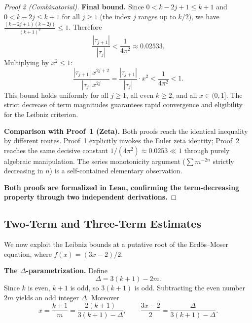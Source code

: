 \documentclass[12pt,a4paper]{article}
\theoremstyle{plain}
\theoremstyle{definition}
\begin{document}
\begin{proof}[Proof 2 (Combinatorial)]
  \medskip
  \noindent\textbf{Final bound.}
  Since $0 < k-2j+1 \le k+1$ and $0 < k-2j \le k+1$ for all $j \ge 1$
  (the index $j$ ranges up to $k/2$), we have
  $\frac{(k-2j+1)(k-2j)}{(k+1)^2} \le 1$.  Therefore
  \[
    \frac{|\tau_{j+1}|}{|\tau_j|}
    < \frac{1}{4\pi^2}
    \approx 0.02533.
  \]
  Multiplying by $x^2 \le 1$:
  \[
    \frac{|\tau_{j+1}|\,x^{2j+2}}{|\tau_j|\,x^{2j}}
    = \frac{|\tau_{j+1}|}{|\tau_j|} \cdot x^2
    < \frac{1}{4\pi^2}
    < 1.
  \]
  This bound holds uniformly for all $j \ge 1$, all even $k \ge 2$,
  and all $x \in (0, 1]$.  The strict decrease of term magnitudes
  guarantees rapid convergence and eligibility for the Leibniz criterion.

  \medskip
  \noindent\textbf{Comparison with Proof~1 (Zeta).}
  Both proofs reach the identical inequality by different routes.
  Proof~1 explicitly invokes the Euler zeta identity; Proof~2 reaches
  the same decisive constant $1/(4\pi^2) \approx 0.0253 \ll 1$ through
  purely algebraic manipulation.  The series monotonicity argument
  ($\sum m^{-2n}$ strictly decreasing in $n$) is a self-contained
  elementary observation.

  \textbf{Both proofs are formalized in Lean, confirming the
  term-decreasing property through two independent derivations.}
\end{proof}

\subsection{Two-Term and Three-Term Estimates}
\label{sec:two-three-term}

We now exploit the Leibniz bounds at a putative root of the
Erd\H{o}s--Moser equation, where $f(x) = (3x-2)/2$.

\medskip
\noindent\textbf{The $\Delta$-parametrization.}
Define
\begin{equation}\label{eq:Delta-def}
  \Delta = 3(k+1) - 2m.
\end{equation}
Since $k$ is even, $k+1$ is odd, so $3(k+1)$ is odd.  Subtracting the
even number $2m$ yields an odd integer $\Delta$.  Moreover
\[
  x = \frac{k+1}{m} = \frac{2(k+1)}{3(k+1)-\Delta},
  \qquad
  \frac{3x-2}{2} = \frac{\Delta}{3(k+1)-\Delta}.
\]
\end{document}
